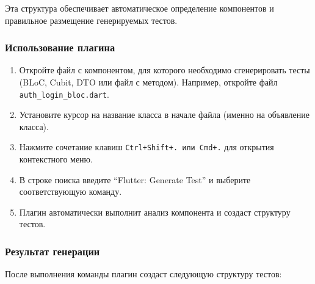\documentclass[14pt, russian]{scrartcl}
\newcommand{\enq}[1]{\enquote{#1}}
\begin{document}
Эта структура обеспечивает автоматическое определение компонентов и правильное размещение генерируемых тестов.

\subsubsection{Использование плагина}

\begin{enumerate}
    \item Откройте файл с компонентом, для которого необходимо сгенерировать тесты (BLoC, Cubit, DTO или файл с методом). Например, откройте файл \texttt{auth\_login\_bloc.dart}.
    \item Установите курсор на название класса в начале файла (именно на объявление класса).
    \item Нажмите сочетание клавиш \texttt{Ctrl+Shift+. или Cmd+.} для открытия контекстного меню.
    \item В строке поиска введите \enq{Flutter: Generate Test} и выберите соответствующую команду.
    \item Плагин автоматически выполнит анализ компонента и создаст структуру тестов.
\end{enumerate}

\subsubsection{Результат генерации}

После выполнения команды плагин создаст следующую структуру тестов:
\end{document}
